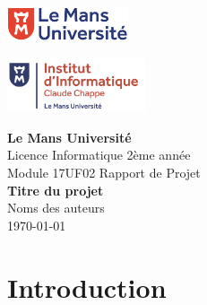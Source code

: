 \documentclass[12pt,a4paper, twoside]{article}
\begin{document}
\begin{titlepage}
    \begin{minipage}[t]{0.48\textwidth}
        \includegraphics[height=1.01cm]{logolemansU.png}
    \end{minipage}
    \hfill
    \begin{minipage}[t]{0.25\textwidth}
        \includegraphics[height=1.6cm]{logo_IC2.png}
    \end{minipage}
    
    \vspace{2cm}
    \begin{center}
        \Large\textbf{Le Mans Université}\\
        \vspace{0.5cm}
        Licence Informatique 2ème année\\
        Module 17UF02 Rapport de Projet\\
        \vspace{0.5cm}
        \Large\textbf{Titre du projet}\\
        \vspace{1cm}
        {\large Noms des auteurs}\\
        \vspace{0.5cm}
        {\normalsize \today}  %
    \end{center}
\end{titlepage}

\newpage
\tableofcontents
\newpage
{}
\section{Introduction}
\end{document}
